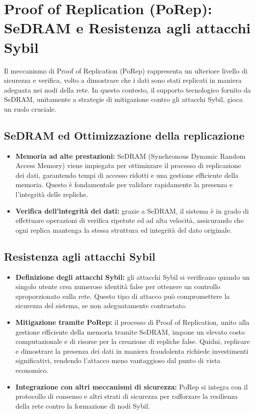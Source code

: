 \documentclass[a4paper,12pt]{report}
\begin{document}
	\section{Proof of Replication (PoRep): SeDRAM e Resistenza agli attacchi Sybil}
	Il meccanismo di Proof of Replication (PoRep) rappresenta un ulteriore livello di sicurezza e verifica, volto a dimostrare che i dati sono stati replicati in maniera adeguata nei nodi della rete. In questo contesto, il supporto tecnologico fornito da SeDRAM, unitamente a strategie di mitigazione contro gli attacchi Sybil, gioca un ruolo cruciale.
	
	\subsection{SeDRAM ed Ottimizzazione della replicazione}
	\begin{itemize}
		\item \textbf{Memoria ad alte prestazioni:} SeDRAM (Synchronous Dynamic Random Access Memory) viene impiegata per ottimizzare il processo di replicazione dei dati, garantendo tempi di accesso ridotti e una gestione efficiente della memoria. Questo è fondamentale per validare rapidamente la presenza e l'integrità delle repliche.
		\item \textbf{Verifica dell’integrità dei dati:} grazie a SeDRAM, il sistema è in grado di effettuare operazioni di verifica ripetute ed ad alta velocità, assicurando che ogni replica mantenga la stessa struttura ed integrità del dato originale.
	\end{itemize}
	
	\subsection{Resistenza agli attacchi Sybil}
	\begin{itemize}
		\item \textbf{Definizione degli attacchi Sybil:} gli attacchi Sybil si verificano quando un singolo utente crea numerose identità false per ottenere un controllo sproporzionato sulla rete. Questo tipo di attacco può compromettere la sicurezza del sistema, se non adeguatamente contrastato.
		\item \textbf{Mitigazione tramite PoRep:} il processo di Proof of Replication, unito alla gestione efficiente della memoria tramite SeDRAM, impone un elevato costo computazionale e di risorse per la creazione di repliche false. Quidni, replicare e dimostrare la presenza dei dati in maniera fraudolenta richiede investimenti significativi, rendendo l'attacco meno vantaggioso dal punto di vista economico.
		\item \textbf{Integrazione con altri meccanismi di sicurezza:} PoRep si integra con il protocollo di consenso e altri strati di sicurezza per rafforzare la resilienza della rete contro la formazione di nodi Sybil.
	\end{itemize}
	
\end{document}
